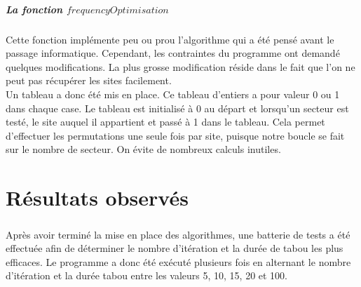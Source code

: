 \documentclass[a4paper, 11pt]{report}
\begin{document}
			\paragraph{La fonction $frequencyOptimisation$\\}
			
			Cette fonction implémente peu ou prou l'algorithme qui a été pensé avant le passage informatique. Cependant, les contraintes du programme ont demandé quelques modifications. La plus grosse modification réside dans le fait que l'on ne peut pas récupérer les sites facilement. \\
			Un tableau a donc été mis en place. Ce tableau d'entiers a pour valeur 0 ou 1 dans chaque case. Le tableau est initialisé à 0 au départ et lorsqu'un secteur est testé, le site auquel il appartient et passé à 1 dans le tableau. Cela permet d'effectuer les permutations une seule fois par site, puisque notre boucle se fait sur le nombre de secteur. On évite de nombreux calculs inutiles.
	
	
	
\chapter{Résultats observés}

    \paragraph{}Après avoir terminé la mise en place des algorithmes, une batterie de tests a été effectuée afin de déterminer le nombre d'itération et la durée de tabou les plus efficaces. Le programme a donc été exécuté plusieurs fois en alternant le nombre d'itération et la durée tabou entre les valeurs 5, 10, 15, 20 et 100.
\end{document}
